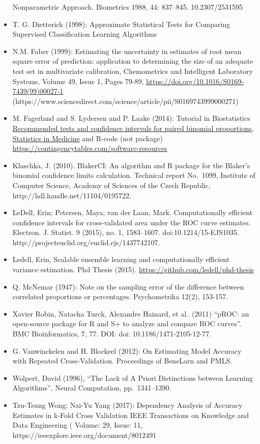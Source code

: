 \documentclass[
  letterpaper,
  DIV=11,
  numbers=noendperiod]{scrartcl}
\begin{document}
\begin{itemize}
  Nonparametric Approach. Biometrics 1988, 44: 837--845. 10.2307/2531595
\item
  T. G. Dietterich (1998): Approximate Statistical Tests for Comparing
  Supervised Classification Learning Algorithms
\item
  N.M. Faber (1999): Estimating the uncertainty in estimates of root
  mean square error of prediction: application to determining the size
  of an adequate test set in multivariate calibration, Chemometrics and
  Intelligent Laboratory Systems, Volume 49, Issue 1, Pages 79-89,
  \url{https://doi.org/10.1016/S0169-7439(99)00027-1}
  (https://www.sciencedirect.com/science/article/pii/S0169743999000271)
\item
  M. Fagerland and S. Lydersen and P. Laake (2014): Tutorial in
  Biostatistics \href{https://doi.org/10.1002/sim.6148}{Recommended
  tests and confidence intervals for paired binomial proportions,
  Statistics in Medicine} and R-code (not package)
  \url{https://contingencytables.com/software-resources}
\item
  Klaschka, J. (2010). BlakerCI: An algorithm and R package for the
  Blaker's binomial confidence limits calculation. Technical report
  No.~1099, Institute of Computer Science, Academy of Sciences of the
  Czech Republic, http://hdl.handle.net/11104/0195722.
\item
  LeDell, Erin; Petersen, Maya; van der Laan, Mark. Computationally
  efficient confidence intervals for cross-validated area under the ROC
  curve estimates. Electron. J. Statist. 9 (2015), no. 1, 1583--1607.
  doi:10.1214/15-EJS1035.
  http://projecteuclid.org/euclid.ejs/1437742107.
\item
  Ledell, Erin, Scalable ensemble learning and computationally efficient
  variance estimation. Phd Thesis (2015).
  \url{https://github.com/ledell/phd-thesis}
\item
  Q. McNemar (1947): Note on the sampling error of the difference
  between correlated proportions or percentages. Psychometrika 12(2),
  153-157.
\item
  Xavier Robin, Natacha Turck, Alexandre Hainard, et al.~(2011) ``pROC:
  an open-source package for R and S+ to analyze and compare ROC
  curves''. BMC Bioinformatics, 7, 77. DOI: doi:
  10.1186/1471-2105-12-77.
\item
  G. Vanwinckelen and H. Blockeel (2012): On Estimating Model Accuracy
  with Repeated Cross-Validation. Proceedings of BeneLarn and PMLS.
\item
  Wolpert, David (1996), ``The Lack of A Priori Distinctions between
  Learning Algorithms'', Neural Computation, pp.~1341--1390.
\item
  Tzu-Tsung Wong; Nai-Yu Yang (2017): Dependency Analysis of Accuracy
  Estimates in k-Fold Cross Validation IEEE Transactions on Knowledge
  and Data Engineering ( Volume: 29, Issue: 11,
  https://ieeexplore.ieee.org/document/8012491
\end{itemize}
\end{document}
